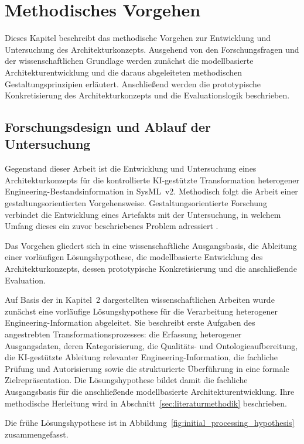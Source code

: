 \section{Methodisches Vorgehen}
\label{sec:methodik}

Dieses Kapitel beschreibt das methodische Vorgehen zur Entwicklung und
Untersuchung des Architekturkonzepts. Ausgehend von den Forschungsfragen und
der wissenschaftlichen Grundlage werden zunächst die modellbasierte
Architekturentwicklung und die daraus abgeleiteten methodischen
Gestaltungsprinzipien erläutert. Anschließend werden die prototypische
Konkretisierung des Architekturkonzepts und die Evaluationslogik beschrieben.

\subsection{Forschungsdesign und Ablauf der Untersuchung}
\label{sec:forschungsdesign}

Gegenstand dieser Arbeit ist die Entwicklung und Untersuchung eines
Architekturkonzepts für die kontrollierte KI-gestützte Transformation
heterogener Engineering-Bestandsinformation in SysML~v2. Methodisch folgt die
Arbeit einer gestaltungsorientierten Vorgehensweise. Gestaltungsorientierte
Forschung verbindet die Entwicklung eines Artefakts mit der Untersuchung, in
welchem Umfang dieses ein zuvor beschriebenes Problem adressiert
\cite{Wieringa2014,Peffers2007}.

Das Vorgehen gliedert sich in eine wissenschaftliche Ausgangsbasis, die
Ableitung einer vorläufigen Lösungshypothese, die modellbasierte Entwicklung
des Architekturkonzepts, dessen prototypische Konkretisierung und die
anschließende Evaluation.

Auf Basis der in Kapitel~2 dargestellten wissenschaftlichen Arbeiten wurde
zunächst eine vorläufige Lösungshypothese für die Verarbeitung heterogener
Engineering-Information abgeleitet. Sie beschreibt erste Aufgaben des
angestrebten Transformationsprozesses: die Erfassung heterogener
Ausgangsdaten, deren Kategorisierung, die Qualitäts- und
Ontologieaufbereitung, die KI-gestützte Ableitung relevanter
Engineering-Information, die fachliche Prüfung und Autorisierung sowie die
strukturierte Überführung in eine formale Zielrepräsentation. Die
Lösungshypothese bildet damit die fachliche Ausgangsbasis für die
anschließende modellbasierte Architekturentwicklung. Ihre methodische
Herleitung wird in Abschnitt~\ref{sec:literaturmethodik} beschrieben.

Die frühe Lösungshypothese ist in
Abbildung~\ref{fig:initial_processing_hypothesis} zusammengefasst.

